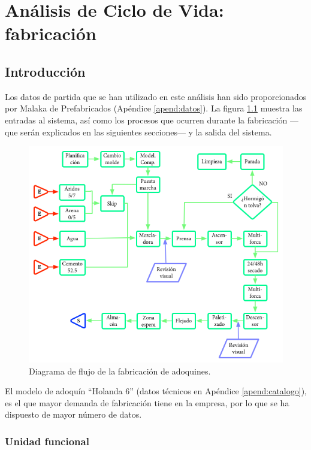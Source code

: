 \chapter{Análisis de Ciclo de Vida: fabricación}\label{cap:fabricacion}

\section{Introducción}\label{sec:obtenciondedatos}
Los datos de partida que se han utilizado en este análisis han sido proporcionados por Malaka de Prefabricados (Apéndice \ref{apend:datos}). La figura \ref{fig:diagrama_de_flujo} muestra las entradas al sistema, así como los procesos que ocurren durante la fabricación —que serán explicados en las siguientes secciones— y la salida del sistema.

\begin{figure}[!htb]
\centering
\includegraphics[width=15cm]{diagrama.png}
\caption{Diagrama de flujo de la fabricación de adoquines.}
\label{fig:diagrama_de_flujo}
\end{figure}

El modelo de adoquín ``Holanda 6'' (datos técnicos en Apéndice \ref{apend:catalogo}), es el que mayor demanda de fabricación tiene en la empresa, por lo que se ha dispuesto de mayor número de datos.

\subsection{Unidad funcional}

